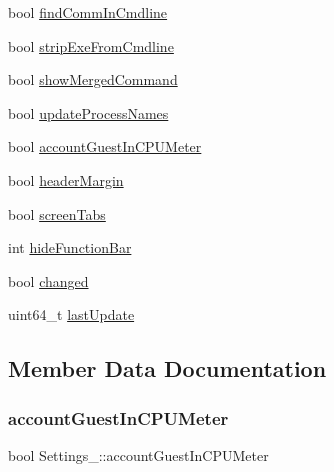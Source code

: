 \begin{DoxyCompactItemize}
$$\item 
bool \hyperlink{structSettings___ae96caa979781222dc81a73d06b4db1a6}{find\+Comm\+In\+Cmdline}
\item 
bool \hyperlink{structSettings___acae26747ca38756e4016ebb30a2912d9}{strip\+Exe\+From\+Cmdline}
\item 
bool \hyperlink{structSettings___aca40a9f6a93379b6808b2383116ce798}{show\+Merged\+Command}
\item 
bool \hyperlink{structSettings___affd9d0293cbe17465533716ce1009884}{update\+Process\+Names}
\item 
bool \hyperlink{structSettings___ac4c4b7754b455123af26297f6c26f864}{account\+Guest\+In\+C\+P\+U\+Meter}
\item 
bool \hyperlink{structSettings___a516f8dc7a61182aa52bbc7ea8fd77a00}{header\+Margin}
\item 
bool \hyperlink{structSettings___a2ca884583bb754c32af6545db186ff72}{screen\+Tabs}
\item 
int \hyperlink{structSettings___a58404018d0af9091dabe765f1ef46e79}{hide\+Function\+Bar}
\item 
bool \hyperlink{structSettings___af9807751f542c7cfeb22975e561046fd}{changed}
\item 
uint64\+\_\+t \hyperlink{structSettings___a695400ff184970ba494eb638e785a86b}{last\+Update}
\end{DoxyCompactItemize}


\subsection{Member Data Documentation}
\mbox{\label{structSettings___ac4c4b7754b455123af26297f6c26f864}} 
\subsubsection{\texorpdfstring{account\+Guest\+In\+C\+P\+U\+Meter}{accountGuestInCPUMeter}}
{\footnotesize\ttfamily bool Settings\+\_\+\+::account\+Guest\+In\+C\+P\+U\+Meter}

\mbox{\label{structSettings___af9807751f542c7cfeb22975e561046fd}} 
